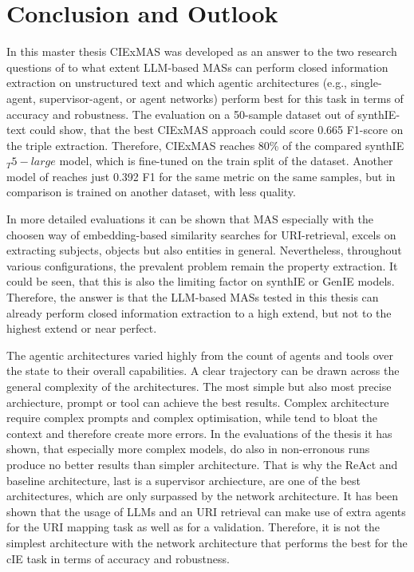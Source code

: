 \documentclass[a4paper,oneside,bibliography=totoc]{scrbook}
\begin{document}
\chapter{Conclusion and Outlook}
\label{ch:conclusion_outlook}

In this master thesis CIExMAS was developed as an answer to the two research questions of to what extent \ac{LLM}-based \acp{MAS} can perform closed information extraction on unstructured text and which agentic architectures (e.g., single-agent, supervisor-agent, or agent networks) perform best for this task in terms of accuracy and robustness. The evaluation on a 50-sample dataset out of synthIE-text could show, that the best CIExMAS approach could score 0.665 F1-score on the triple extraction. Therefore, CIExMAS reaches 80\% of the compared synthIE${_T5-large}$ model, which is fine-tuned on the train split of the dataset. Another model of \citet{Josifoski2021} reaches just 0.392 F1 for the same metric on the same samples, but in comparison is trained on another dataset, with less quality.

In more detailed evaluations it can be shown that MAS especially with the choosen way of embedding-based similarity searches for URI-retrieval, excels on extracting subjects, objects but also entities in general. Nevertheless, throughout various configurations, the prevalent problem remain the property extraction. It could be seen, that this is also the limiting factor on synthIE or GenIE models. Therefore, the answer is that the \ac{LLM}-based \acp{MAS} tested in this thesis can already perform closed information extraction to a high extend, but not to the highest extend or near perfect.

The agentic architectures varied highly from the count of agents and tools over the state to their overall capabilities. A clear trajectory can be drawn across the general complexity of the architectures. The most simple but also most precise archiecture, prompt or tool can achieve the best results. Complex architecture require complex prompts and complex optimisation, while tend to bloat the context and therefore create more errors. In the evaluations of the thesis it has shown, that especially more complex models, do also in non-erronous runs produce no better results than simpler architecture. That is why the ReAct and baseline architecture, last is a supervisor archiecture, are one of the best architectures, which are only surpassed by the network architecture. It has been shown that the usage of \acp{LLM} and an URI retrieval can make use of extra agents for the URI mapping task as well as for a validation. Therefore, it is not the simplest architecture with the network architecture that performs the best for the \ac{cIE} task in terms of accuracy and robustness.
\end{document}
